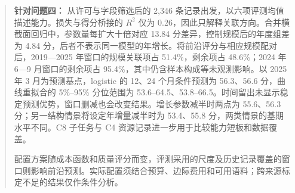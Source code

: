 \begin{abstract}
\textbf{针对问题四：} 从许可与字段筛选后的 2,346 条记录出发，以六项评测均值描述能力。损失与得分桥接的 $R^2$ 仅为 0.26，因此只解释关联方向。合并横截面回归中，参数量每扩大十倍对应 13.84 分差异，控制规模后的年度组差为 4.84 分，后者不表示同一模型的年增长。将前沿评分与相应规模配对后，2019—2025 年窗口的规模关联项占 51.4\%，剩余项占 48.6\%；2024 年 6—9 月窗口的剩余项占 95.4\%，其中仍含样本构成等未观测影响。以 2025 年 3 月为预测基点，logistic 的 12、24 个月条件预测为 56.3、56.6 分，曲线重拟合的 5\%--95\% 分位范围为 53.6--64.5、53.8--66.5。时间留出未显示稳定预测优势，窗口删减也会改变结果。增长参数减半时两点为 55.6、56.3 分；另一结构情景将设定年增量减半时为 53.4、55.8 分，两类情景的基期水平不同。C8 子任务与 C4 资源记录进一步用于比较能力短板和数据覆盖。

配置方案随成本函数和质量评分而变，评测采用的尺度及历史记录覆盖的窗口则影响前沿预测。实际配置须结合预算、边际费用和可用语料；跨来源标定不足的结果仅作条件分析。

\end{abstract}
\endgroup
